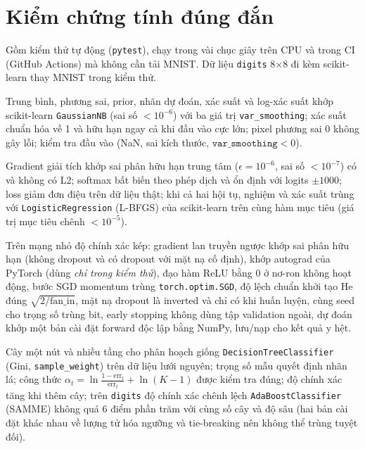 \section{Kiểm chứng tính đúng đắn}
\label{sec:verification}

Gồm  kiểm thử tự động (\texttt{pytest}), chạy trong vài chục giây trên CPU và trong CI (GitHub Actions) mà không cần tải MNIST. Dữ liệu \texttt{digits} 8$\times$8 đi kèm scikit-learn thay MNIST trong kiểm thử.

\begin{description}[leftmargin=0pt,labelindent=0pt,style=unboxed]
\item[Gaussian NB.] Trung bình, phương sai, prior, nhãn dự đoán, xác suất và log-xác suất khớp scikit-learn \texttt{GaussianNB} (sai số $<10^{-6}$) với ba giá trị \texttt{var\_smoothing}; xác suất chuẩn hóa về 1 và hữu hạn ngay cả khi đầu vào cực lớn; pixel phương sai 0 không gây lỗi; kiểm tra đầu vào (NaN, sai kích thước, $\texttt{var\_smoothing}<0$).
\item[Softmax regression.] Gradient giải tích khớp sai phân hữu hạn trung tâm ($\epsilon=10^{-6}$, sai số $<10^{-7}$) có và không có L2; softmax bất biến theo phép dịch và ổn định với logits $\pm1000$; loss giảm đơn điệu trên dữ liệu thật; khi cả hai hội tụ, nghiệm và xác suất trùng với \texttt{LogisticRegression} (L-BFGS) của scikit-learn trên cùng hàm mục tiêu (giá trị mục tiêu chênh $<10^{-5}$).
\item[MLP.] Trên mạng nhỏ độ chính xác kép: gradient lan truyền ngược khớp sai phân hữu hạn (không dropout và có dropout với mặt nạ cố định), khớp autograd của PyTorch (dùng \emph{chỉ trong kiểm thử}), đạo hàm ReLU bằng 0 ở nơ-ron không hoạt động, bước SGD momentum trùng \texttt{torch.optim.SGD}, độ lệch chuẩn khởi tạo He đúng $\sqrt{2/\mathrm{fan\_in}}$, mặt nạ dropout là inverted và chỉ có khi huấn luyện, cùng seed cho trọng số trùng bit, early stopping không dùng tập validation ngoài, dự đoán khớp một bản cài đặt forward độc lập bằng NumPy, lưu/nạp cho kết quả y hệt.
\item[AdaBoost.] Cây một nút và nhiều tầng cho phân hoạch giống \texttt{DecisionTreeClassifier} (Gini, \texttt{sample\_weight}) trên dữ liệu lưới nguyên; trọng số mẫu quyết định nhãn lá; công thức $\alpha_t=\ln\frac{1-\mathrm{err}_t}{\mathrm{err}_t}+\ln(K-1)$ được kiểm tra đúng; độ chính xác tăng khi thêm cây; trên \texttt{digits} độ chính xác chênh lệch \texttt{AdaBoostClassifier} (SAMME) không quá 6 điểm phần trăm với cùng số cây và độ sâu (hai bản cài đặt khác nhau về lượng tử hóa ngưỡng và tie-breaking nên không thể trùng tuyệt đối).

\end{description}
